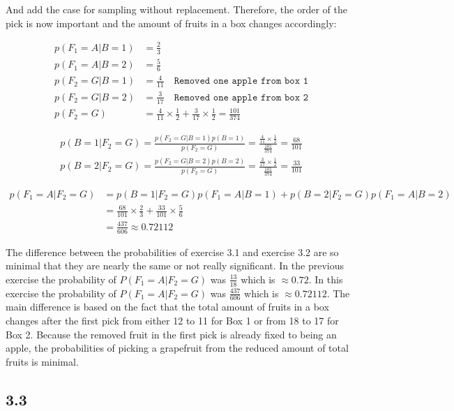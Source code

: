 \documentclass[a4paper]{article}
\begin{document}
And add the case for sampling without replacement. Therefore, the order of the pick is now important and the amount of fruits in a box changes accordingly:

\begin{align*}
	p(F_1 = A | B = 1) &= \frac{2}{3}\\
	p(F_1 = A | B = 2) &= \frac{5}{6}\\
	p(F_2 = G | B = 1) &= \frac{4}{11}  \quad \texttt{Removed one apple from box 1}\\
	p(F_2 = G | B = 2) &= \frac{3}{17} \quad \texttt{Removed one apple from box 2}\\
		p(F_2 = G) &= \frac{4}{11} \times \frac{1}{2} + \frac{3}{17} \times \frac{1}{2} = \frac{101}{374}
\end{align*}

\begin{align*}
	p(B = 1 | F_2 = G) = \frac{p(F_2 = G | B = 1)p(B = 1)}{p(F_2 = G)} = \frac{\frac{4}{11} \times \frac{1}{2}}{\frac{101}{374}} = \frac{68}{101}\\
	p(B = 2 | F_2 = G) = \frac{p(F_2 = G | B = 2)p(B = 2)}{p(F_2 = G)} = \frac{\frac{3}{17} \times \frac{1}{2}}{\frac{101}{374}} = \frac{33}{101}
\end{align*}

\begin{align*}
	p(F_1 = A | F_2 = G) &=   p(B = 1| F_2 = G)p(F_1 = A | B = 1) + p(B = 2 | F_2 = G)p(F_1 = A | B = 2)\\
	&= \frac{68}{101} \times \frac{2}{3} + \frac{33}{101} \times \frac{5}{6}\\
	&= \frac{437}{606} \approx 0.72112
\end{align*}

The difference between the probabilities of exercise 3.1 and exercise 3.2 are so minimal that they are nearly the same or not really significant. In the previous exercise the probability of $P(F_1 = A | F_2 = G)$ was $\frac{13}{18}$ which is $\approx 0.72$. In this exercise the probability of $P(F_1 = A | F_2 = G)$ was $\frac{437}{606}$ which is $\approx 0.72112$. The main difference is based on the fact that the total amount of fruits in a box changes after the first pick from either 12 to 11 for Box 1 or from 18 to 17 for Box 2. Because the removed fruit in the first pick is already fixed to being an apple, the probabilities of picking a grapefruit from the reduced amount of total fruits is minimal.


\subsection*{3.3}
\end{document}
